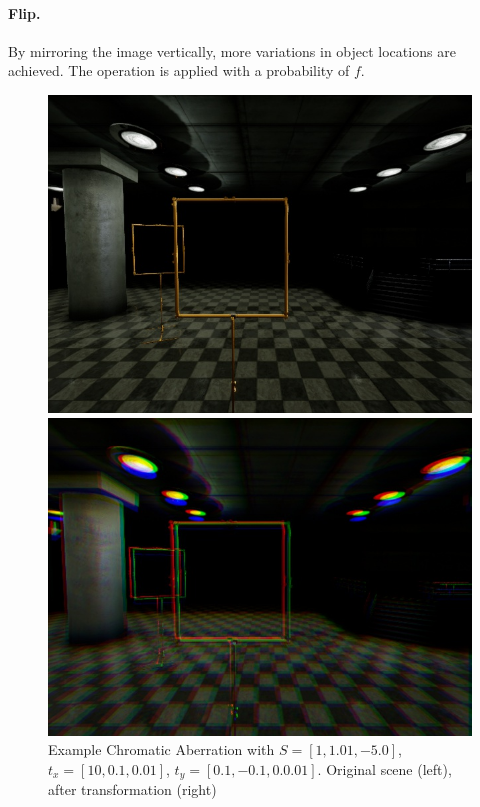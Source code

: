 \paragraph{Flip.} By mirroring the image vertically, more variations in object locations are achieved. The operation is applied with a probability of $f$.


\begin{figure}[htbp]
	\centering
	\begin{minipage}{0.49\textwidth}
		\includegraphics[width=\textwidth]{fig/gate_example}
	\end{minipage}
	\begin{minipage}{0.49\textwidth}
		\includegraphics[width=\textwidth]{fig/gate_example_chromatic}
	\end{minipage}
	\caption{Example Chromatic Aberration with $S=[1, 1.01, -5.0]$, $t_x=[10,0.1,0.01]$, $t_y=[0.1,-0.1,0.0.01]$. Original scene (left), after transformation (right)}
	\label{fig:chromatic}
\end{figure}
